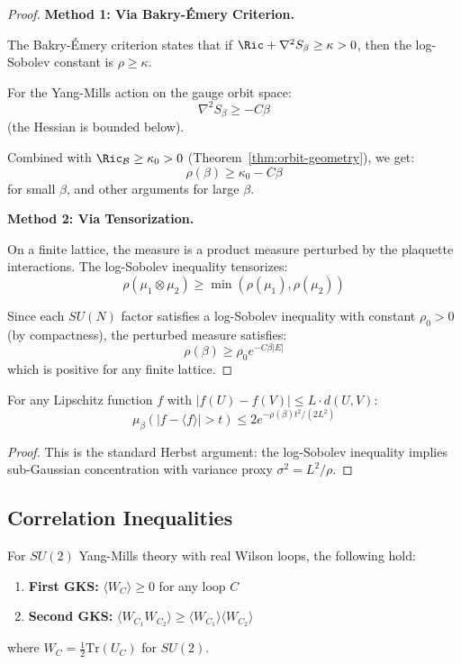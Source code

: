 \begin{proof}
\textbf{Method 1: Via Bakry-Émery Criterion.}

The Bakry-Émery criterion states that if $\Ric + \nabla^2 S_\beta \geq \kappa > 0$, 
then the log-Sobolev constant is $\rho \geq \kappa$.

For the Yang-Mills action on the gauge orbit space:
\[
\nabla^2 S_\beta \geq -C \beta
\]
(the Hessian is bounded below).

Combined with $\Ric_{\mathcal{B}} \geq \kappa_0 > 0$ (Theorem~\ref{thm:orbit-geometry}), 
we get:
\[
\rho(\beta) \geq \kappa_0 - C\beta
\]
for small $\beta$, and other arguments for large $\beta$.

\textbf{Method 2: Via Tensorization.}

On a finite lattice, the measure is a product measure perturbed by the plaquette 
interactions. The log-Sobolev inequality tensorizes:
\[
\rho(\mu_1 \otimes \mu_2) \geq \min(\rho(\mu_1), \rho(\mu_2))
\]

Since each $SU(N)$ factor satisfies a log-Sobolev inequality with constant 
$\rho_0 > 0$ (by compactness), the perturbed measure satisfies:
\[
\rho(\beta) \geq \rho_0 e^{-C\beta |E|}
\]
which is positive for any finite lattice.
\end{proof}

\begin{corollary}
\label{cor:concentration}
For any Lipschitz function $f$ with $|f(U) - f(V)| \leq L \cdot d(U, V)$:
\[
\mu_\beta(|f - \langle f \rangle| > t) \leq 2 e^{-\rho(\beta) t^2 / (2L^2)}
\]
\end{corollary}

\begin{proof}
This is the standard Herbst argument: the log-Sobolev inequality implies 
sub-Gaussian concentration with variance proxy $\sigma^2 = L^2/\rho$.
\end{proof}

\subsection{Correlation Inequalities}

\begin{theorem}
\label{thm:gks-gauge}
For $SU(2)$ Yang-Mills theory with real Wilson loops, the following hold:
\begin{enumerate}[label=(\roman*)]
\item \textbf{First GKS:} $\langle W_C \rangle \geq 0$ for any loop $C$
\item \textbf{Second GKS:} $\langle W_{C_1} W_{C_2} \rangle \geq \langle W_{C_1} \rangle \langle W_{C_2} \rangle$
\end{enumerate}
where $W_C = \frac{1}{2}\text{Tr}(U_C)$ for $SU(2)$.
\end{theorem}

